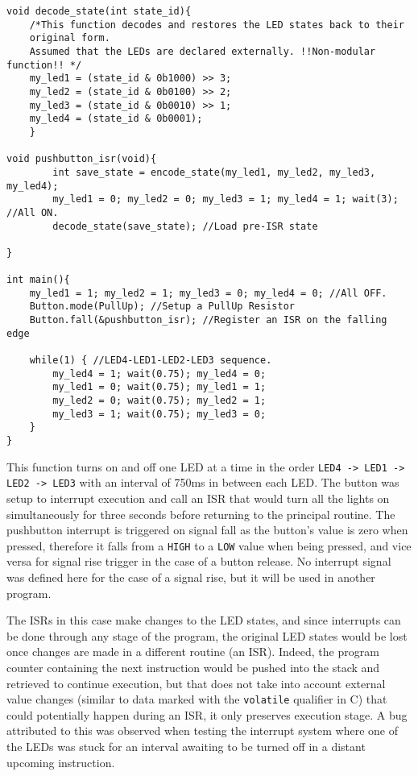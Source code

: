 \documentclass{article}
\begin{document}
\begin{verbatim}
void decode_state(int state_id){
    /*This function decodes and restores the LED states back to their
    original form.
    Assumed that the LEDs are declared externally. !!Non-modular function!! */
    my_led1 = (state_id & 0b1000) >> 3;
    my_led2 = (state_id & 0b0100) >> 2;
    my_led3 = (state_id & 0b0010) >> 1;
    my_led4 = (state_id & 0b0001);
    }

void pushbutton_isr(void){
        int save_state = encode_state(my_led1, my_led2, my_led3, my_led4);
        my_led1 = 0; my_led2 = 0; my_led3 = 1; my_led4 = 1; wait(3); //All ON.
        decode_state(save_state); //Load pre-ISR state
        
}

int main(){
    my_led1 = 1; my_led2 = 1; my_led3 = 0; my_led4 = 0; //All OFF.
    Button.mode(PullUp); //Setup a PullUp Resistor
    Button.fall(&pushbutton_isr); //Register an ISR on the falling edge
    
    while(1) { //LED4-LED1-LED2-LED3 sequence.
        my_led4 = 1; wait(0.75); my_led4 = 0;
        my_led1 = 0; wait(0.75); my_led1 = 1;
        my_led2 = 0; wait(0.75); my_led2 = 1;
        my_led3 = 1; wait(0.75); my_led3 = 0;     
    }
}
\end{verbatim}
\pagebreak

This function turns on and off one LED at a time in the order \texttt{LED4 -> LED1 -> LED2 -> LED3} with an interval of 750ms in between each LED. The button was setup to interrupt execution and call an ISR that would turn all the lights on simultaneously for three seconds before returning to the principal routine. The pushbutton interrupt is triggered on signal fall as the button's value is zero when pressed, therefore it falls from a \texttt{HIGH} to a \texttt{LOW} value when being pressed, and vice versa for signal rise trigger in the case of a button release. No interrupt signal was defined here for the case of a signal rise, but it will be used in another program.

The ISRs in this case make changes to the LED states, and since interrupts can be done through any stage of the program, the original LED states would be lost once changes are made in a different routine (an ISR). Indeed, the program counter containing the next instruction would be pushed into the stack and retrieved to continue execution, but that does not take into account external value changes (similar to data marked with the \texttt{volatile} qualifier in C) that could potentially happen during an ISR, it only preserves execution stage. A bug attributed to this was observed when testing the interrupt system where one of the LEDs was stuck for an interval awaiting to be turned off in a distant upcoming instruction.
\end{document}

